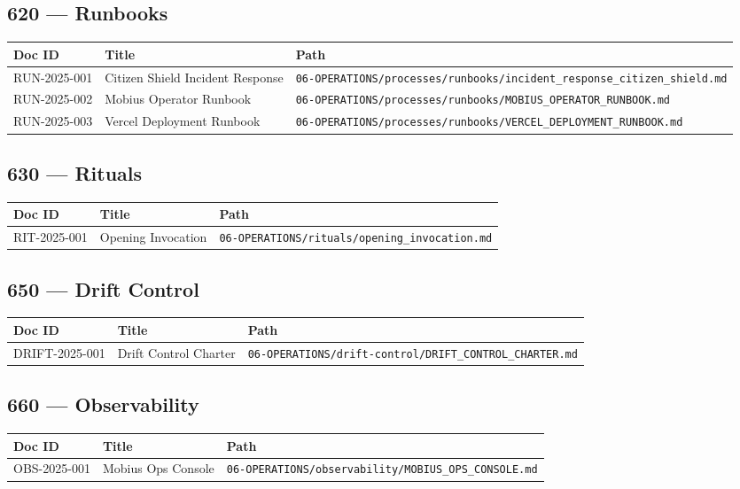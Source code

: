 \documentclass[11pt,a4paper]{article}
\begin{document}
\subsection{620 — Runbooks}

\begin{longtable}{p{2cm}p{8cm}p{3cm}}
\toprule
\textbf{Doc ID} & \textbf{Title} & \textbf{Path} \\
\midrule
RUN-2025-001 & Citizen Shield Incident Response & \texttt{06-OPERATIONS/processes/runbooks/incident\_response\_citizen\_shield.md} \\
RUN-2025-002 & Mobius Operator Runbook & \texttt{06-OPERATIONS/processes/runbooks/MOBIUS\_OPERATOR\_RUNBOOK.md} \\
RUN-2025-003 & Vercel Deployment Runbook & \texttt{06-OPERATIONS/processes/runbooks/VERCEL\_DEPLOYMENT\_RUNBOOK.md} \\
\bottomrule
\end{longtable}

\subsection{630 — Rituals}

\begin{longtable}{p{2cm}p{8cm}p{3cm}}
\toprule
\textbf{Doc ID} & \textbf{Title} & \textbf{Path} \\
\midrule
RIT-2025-001 & Opening Invocation & \texttt{06-OPERATIONS/rituals/opening\_invocation.md} \\
\bottomrule
\end{longtable}

\subsection{650 — Drift Control}

\begin{longtable}{p{2cm}p{8cm}p{3cm}}
\toprule
\textbf{Doc ID} & \textbf{Title} & \textbf{Path} \\
\midrule
DRIFT-2025-001 & Drift Control Charter & \texttt{06-OPERATIONS/drift-control/DRIFT\_CONTROL\_CHARTER.md} \\
\bottomrule
\end{longtable}

\subsection{660 — Observability}

\begin{longtable}{p{2cm}p{8cm}p{3cm}}
\toprule
\textbf{Doc ID} & \textbf{Title} & \textbf{Path} \\
\midrule
OBS-2025-001 & Mobius Ops Console & \texttt{06-OPERATIONS/observability/MOBIUS\_OPS\_CONSOLE.md} \\
\bottomrule
\end{longtable}
\end{document}
